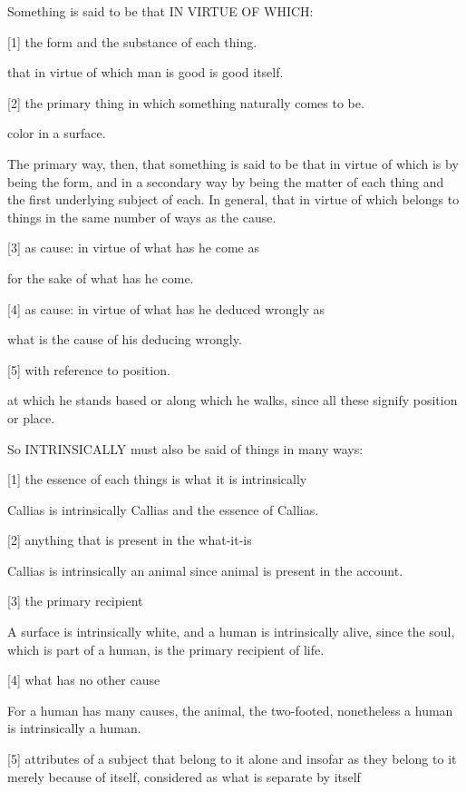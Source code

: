 
Something is said to be that IN VIRTUE OF WHICH:

[1]     the form and the substance of each thing.

        that in virtue of which man is good is good itself.

[2]     the primary thing in which something naturally comes to be.

        color in a surface.

The primary way, then, that something is said to be that in virtue of which
is by being the form, and in a secondary way by being the matter of each thing
and the first underlying subject of each.
In general, that in virtue of which belongs to things in the same
number of ways as the cause.

[3]     as cause: in virtue of what has he come as

        for the sake of what has he come.

[4]     as cause: in virtue of what has he deduced wrongly as

        what is the cause of his deducing wrongly.

[5]     with reference to position.

        at which he stands based or along which he walks,
        since all these signify position or place.

So INTRINSICALLY must also be said of things in many ways:

[1]     the essence of each things is what it is intrinsically

        Callias is intrinsically Callias and the essence of Callias.

[2]     anything that is present in the what-it-is

        Callias is intrinsically an animal since animal is present in the account.

[3]     the primary recipient

        A surface is intrinsically white, and a human is intrinsically alive,
        since the soul, which is part of a human, is the primary recipient of life.

[4]     what has no other cause

        For a human has many causes, the animal, the two-footed,
        nonetheless a human is intrinsically a human.

[5]     attributes of a subject that belong to it alone
        and insofar as they belong to it merely because of itself,
        considered as what is separate by itself
